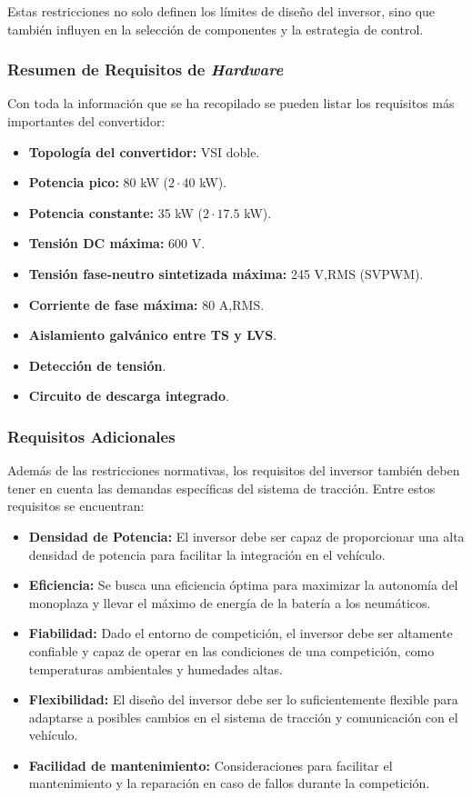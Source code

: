 Estas restricciones no solo definen los límites de diseño del inversor, sino que también influyen en la selección de componentes y la estrategia de control.

\subsubsection{Resumen de Requisitos de \textit{Hardware}}

Con toda la información que se ha recopilado se pueden listar los requisitos más importantes del convertidor:
\begin{itemize}
	\item \textbf{Topología del convertidor:} VSI doble.
	\item \textbf{Potencia pico:} 80 kW ($2\cdot40$ kW).
	\item \textbf{Potencia constante:} 35 kW ($2\cdot17.5$ kW).
	\item \textbf{Tensión DC máxima:} 600 V.
	\item \textbf{Tensión fase-neutro sintetizada máxima:} 245 V,RMS (SVPWM).
	\item \textbf{Corriente de fase máxima:} 80 A,RMS.
	\item \textbf{Aislamiento galvánico entre TS y LVS}.
	\item \textbf{Detección de tensión}.
	\item \textbf{Circuito de descarga integrado}.
	
	
\end{itemize}

\subsubsection{Requisitos Adicionales}
Además de las restricciones normativas, los requisitos del inversor también deben tener en cuenta las demandas específicas del sistema de tracción. Entre estos requisitos se encuentran:

\begin{itemize}
	\item \textbf{Densidad de Potencia:} El inversor debe ser capaz de proporcionar una alta densidad de potencia para facilitar la integración en el vehículo.
	\item \textbf{Eficiencia:} Se busca una eficiencia óptima para maximizar la autonomía del monoplaza y llevar el máximo de energía de la batería a los neumáticos.
	\item \textbf{Fiabilidad:} Dado el entorno de competición, el inversor debe ser altamente confiable y capaz de operar en las condiciones de una competición, como temperaturas ambientales y humedades altas.
	\item \textbf{Flexibilidad:} El diseño del inversor debe ser lo suficientemente flexible para adaptarse a posibles cambios en el sistema de tracción y comunicación con el vehículo.
	\item \textbf{Facilidad de mantenimiento:} Consideraciones para facilitar el mantenimiento y la reparación en caso de fallos durante la competición.
\end{itemize}

